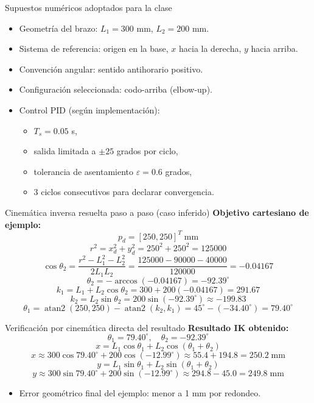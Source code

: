 \documentclass[aspectratio=169]{beamer}
\begin{document}
\begin{frame}{Supuestos numéricos adoptados para la clase}
\begin{itemize}
  \item Geometría del brazo: $L_1=300$ mm, $L_2=200$ mm.
  \item Sistema de referencia: origen en la base, $x$ hacia la derecha, $y$ hacia arriba.
  \item Convención angular: sentido antihorario positivo.
  \item Configuración seleccionada: codo-arriba (elbow-up).
  \item Control PID (según implementación):
  \begin{itemize}
    \item $T_s=0.05$ s,
    \item salida limitada a $\pm 25$ grados por ciclo,
    \item tolerancia de asentamiento $\varepsilon=0.6$ grados,
    \item 3 ciclos consecutivos para declarar convergencia.
  \end{itemize}
\end{itemize}
\end{frame}

\begin{frame}{Cinemática inversa resuelta paso a paso (caso inferido)}
\textbf{Objetivo cartesiano de ejemplo:}
\[
p_d = [250,250]^T\;\text{mm}
\]
\[
r^2=x_d^2+y_d^2=250^2+250^2=125000
\]
\[
\cos\theta_2 = \frac{r^2-L_1^2-L_2^2}{2L_1L_2}
=\frac{125000-90000-40000}{120000}=-0.04167
\]
\[
\theta_2 = -\arccos(-0.04167) = -92.39^\circ
\]
\[
k_1=L_1+L_2\cos\theta_2=300+200(-0.04167)=291.67
\]
\[
k_2=L_2\sin\theta_2=200\sin(-92.39^\circ)\approx-199.83
\]
\[
\theta_1=\operatorname{atan2}(250,250)-\operatorname{atan2}(k_2,k_1)
=45^\circ-(-34.40^\circ)=79.40^\circ
\]
\end{frame}

\begin{frame}{Verificación por cinemática directa del resultado}
\textbf{Resultado IK obtenido:}
\[
\theta_1=79.40^\circ,\quad \theta_2=-92.39^\circ
\]
\[
x=L_1\cos\theta_1+L_2\cos(\theta_1+\theta_2)
\]
\[
x\approx 300\cos79.40^\circ+200\cos(-12.99^\circ)
\approx 55.4+194.8=250.2\;\text{mm}
\]
\[
y=L_1\sin\theta_1+L_2\sin(\theta_1+\theta_2)
\]
\[
y\approx 300\sin79.40^\circ+200\sin(-12.99^\circ)
\approx 294.8-45.0=249.8\;\text{mm}
\]
\begin{itemize}
  \item Error geométrico final del ejemplo: menor a 1 mm por redondeo.
\end{itemize}
\end{frame}
\end{document}
